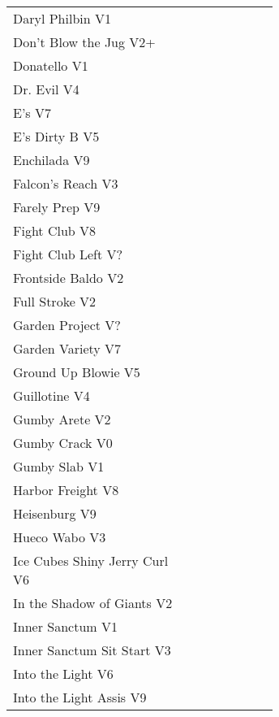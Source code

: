 \begin{center}
\begin{supertabular}{p{0.65\linewidth}r}
Daryl Philbin V1 & \pageref{rt:Daryl Philbin} \\
Don't Blow the Jug V2+ & \pageref{rt:Don't Blow the Jug} \\
Donatello V1 & \pageref{rt:Donatello} \\
Dr. Evil V4 & \pageref{rt:Dr. Evil} \\
E's V7 & \pageref{rt:E's} \\
E's Dirty B V5 & \pageref{rt:E's Dirty B} \\
Enchilada V9 & \pageref{rt:Enchilada} \\
Falcon's Reach V3 & \pageref{rt:Falcon's Reach} \\
Farely Prep V9 & \pageref{rt:Farely Prep} \\
Fight Club V8 & \pageref{rt:Fight Club} \\
Fight Club Left V? & \pageref{rt:Fight Club Left} \\
Frontside Baldo V2 & \pageref{rt:Frontside Baldo} \\
Full Stroke V2 & \pageref{rt:Full Stroke} \\
Garden Project V? & \pageref{rt:Garden Project} \\
Garden Variety V7 & \pageref{rt:Garden Variety} \\
Ground Up Blowie V5 & \pageref{rt:Ground Up Blowie} \\
Guillotine V4 & \pageref{rt:Guillotine} \\
Gumby Arete V2 & \pageref{rt:Gumby Arete} \\
Gumby Crack V0 & \pageref{rt:Gumby Crack} \\
Gumby Slab V1 & \pageref{rt:Gumby Slab} \\
Harbor Freight V8 & \pageref{vr:Harbor Freight} \\
Heisenburg V9 & \pageref{rt:Heisenburg} \\
Hueco Wabo V3 & \pageref{rt:Hueco Wabo} \\
Ice Cubes Shiny Jerry Curl V6 & \pageref{rt:Ice Cubes Shiny Jerry Curl} \\
In the Shadow of Giants V2 & \pageref{rt:In the Shadow of Giants} \\
Inner Sanctum V1 & \pageref{rt:Inner Sanctum} \\
Inner Sanctum Sit Start V3 & \pageref{vr:Inner Sanctum Sit Start} \\
Into the Light V6 & \pageref{rt:Into the Light} \\
Into the Light Assis V9 & \pageref{vr:Into the Light Assis} \\

\end{supertabular}
\end{center}
